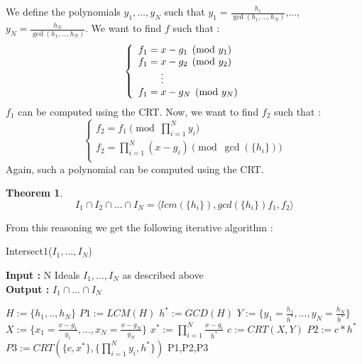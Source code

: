 \documentclass{article}
\newtheorem{theorem}{Theorem}[section]
\begin{document}
We define the polynomials $y_{1},\dots,y_{N}$ such that $y_{1} = \displaystyle \frac{h_{1}}{\gcd(h_{1},...,h_{N})}$,$\dots$, $y_{N} = \displaystyle \frac{h_{N}}{\gcd(h_{1},...,h_{N})}$. We want to find $f$ such that :
\begin{displaymath}
    \left\{
    \begin{array}{ll}
        f_{1} = x-g_{1} \pmod {y_{1}} \\
        f_{1} = x-g_{2} \pmod {y_{2}} \\
        \hspace{8mm} \vdots \\
        f_{1} = x-g_{N} \pmod{y_{N}}\\
    \end{array}
    \right.
\end{displaymath}
$f_{1}$ can be computed using the CRT. Now, we want to find $f_{2}$ such that : 
\begin{displaymath}
    \left\{
    \begin{array}{ll}
        f_{2} = f_{1} \pmod {\prod_{i=1}^{N} y_{i}} \\
        f_{2} = \prod^{N}_{i=1} (x-g_{i}) \pmod {\gcd(\{h_{i}\})} \\
    \end{array}
    \right.
\end{displaymath}
Again, such a polynomial can be computed using the CRT. 

\begin{theorem}
    \begin{displaymath}
        I_{1} \cap I_{2} \cap \dots \cap I_{N} = \langle lcm(\{h_{i}\}), gcd(\{h_{i}\})f_{1},f_{2} \rangle
    \end{displaymath}
\end{theorem}

From this reasoning we get the following iterative algorithm : 

\begin{algorithm}
    \caption{Intersect1($I_{1},...,I_{N}$)}\label{alg:intersect-n-ideals-equal-gcd}
    \textbf{Input : } N Ideals $I_{1},...,I_{N}$ as described above \\
    \textbf{Output : }$I_{1} \cap ...\cap I_ {N}$
\begin{algorithmic}
    \State $H := \{h_{1},..,h_{N}\}$
    \State $P1 := LCM(H)$
    \State $h^{*} := GCD(H)$
    \State $Y:= \{y_{1}= \frac{h_{1}}{h^{*}},...,y_{N}= \frac{h_{N}}{h^{*}}\}$
    \State $X := \{x_{1} = \frac{x-g_{1}}{y_{1}},...,x_{N} =\frac{x-g_{N}}{y_{N}}\}$
    \State $x^{*} := \prod^{N}_{i=1} \frac{x-g_{i}}{h^{*}}$
    \State $c:= CRT(X,Y)$
    \State $P2 := c*h^{*}$
    \State $P3 := CRT(\{c,x^{*}\},\{\prod^{N}_{i=1} y_{i}, h^{*}\})$
    \State \Return P1,P2,P3
\end{algorithmic}
\end{algorithm}
\end{document}
